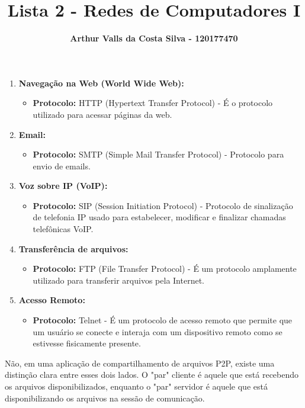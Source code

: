 \documentclass{homework}
\title{\textbf{Lista 2 - Redes de Computadores I}}
\author{\textbf{Arthur Valls da Costa Silva - 120177470}}
\begin{document}
\maketitle

\begin{exercise}[R1)]
\begin{enumerate}
    \item \textbf{Navegação na Web (World Wide Web):}
    \begin{itemize}
        \item \textbf{Protocolo:} HTTP (Hypertext Transfer Protocol) - É o protocolo utilizado para acessar páginas da web.
    \end{itemize}

    \item \textbf{Email:}
    \begin{itemize}
        \item \textbf{Protocolo:} SMTP (Simple Mail Transfer Protocol) - Protocolo para envio de emails.
    \end{itemize}
    \item \textbf{Voz sobre IP (VoIP):}
    \begin{itemize}
        \item \textbf{Protocolo:} SIP (Session Initiation Protocol) - Protocolo de sinalização de telefonia IP usado para estabelecer, modificar e finalizar chamadas telefônicas VoIP.
    \end{itemize}

    \item \textbf{Transferência de arquivos:}
    \begin{itemize}
        \item \textbf{Protocolo:} FTP (File Transfer Protocol) - É um protocolo amplamente utilizado para transferir arquivos pela Internet.
    \end{itemize}
    \item \textbf{Acesso Remoto:}
    \begin{itemize}
        \item \textbf{Protocolo:} Telnet - É um protocolo de acesso remoto que permite que um usuário se conecte e interaja com um dispositivo remoto como se estivesse fisicamente presente.
    \end{itemize}
\end{enumerate}
\end{exercise}
\begin{exercise}[R4)]

Não, em uma aplicação de compartilhamento de arquivos P2P, existe uma distinção clara entre esses dois lados. O "par" cliente é aquele que está recebendo os arquivos disponibilizados, enquanto o "par" servidor é aquele que está disponibilizando os arquivos na sessão de comunicação.
    
\end{exercise}
\end{document}
